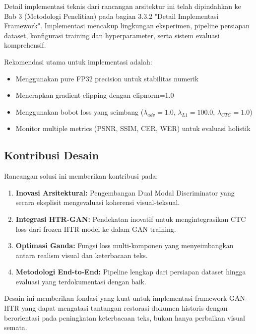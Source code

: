 \documentclass[12pt,a4paper]{article}
\begin{document}
Detail implementasi teknis dari rancangan arsitektur ini telah dipindahkan ke Bab 3 (Metodologi Penelitian) pada bagian 3.3.2 "Detail Implementasi Framework". Implementasi mencakup lingkungan eksperimen, pipeline persiapan dataset, konfigurasi training dan hyperparameter, serta sistem evaluasi komprehensif.

Rekomendasi utama untuk implementasi adalah:
\begin{itemize}
    \item Menggunakan pure FP32 precision untuk stabilitas numerik
    \item Menerapkan gradient clipping dengan clipnorm=1.0
    \item Menggunakan bobot loss yang seimbang ($\lambda_{adv}=1.0$, $\lambda_{L1}=100.0$, $\lambda_{CTC}=1.0$)
    \item Monitor multiple metrics (PSNR, SSIM, CER, WER) untuk evaluasi holistik
\end{itemize}

\subsection{Kontribusi Desain}

Rancangan solusi ini memberikan kontribusi pada:

\begin{enumerate}
    \item \textbf{Inovasi Arsitektural:} Pengembangan Dual Modal Discriminator yang secara eksplisit mengevaluasi koherensi visual-teksual.

    \item \textbf{Integrasi HTR-GAN:} Pendekatan inovatif untuk mengintegrasikan CTC loss dari frozen HTR model ke dalam GAN training.

    \item \textbf{Optimasi Ganda:} Fungsi loss multi-komponen yang menyeimbangkan antara realism visual dan keterbacaan teks.

    \item \textbf{Metodologi End-to-End:} Pipeline lengkap dari persiapan dataset hingga evaluasi yang terdokumentasi dengan baik.
\end{enumerate}

Desain ini memberikan fondasi yang kuat untuk implementasi framework GAN-HTR yang dapat mengatasi tantangan restorasi dokumen historis dengan berorientasi pada peningkatan keterbacaan teks, bukan hanya perbaikan visual semata.
\end{document}
